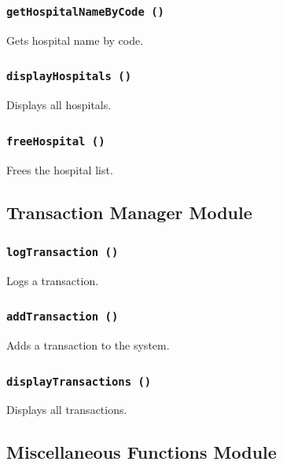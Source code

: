 \documentclass[12pt,a4paper]{report}
\begin{document}
\subsubsection{\texttt{getHospitalNameByCode ()}}
Gets hospital name by code.


\subsubsection{\texttt{displayHospitals ()}}
Displays all hospitals.


\subsubsection{\texttt{freeHospital ()}}
Frees the hospital list.


\subsection{Transaction Manager Module}
\subsubsection{\texttt{logTransaction ()}}
Logs a transaction.


\subsubsection{\texttt{addTransaction ()}}
Adds a transaction to the system.


\subsubsection{\texttt{displayTransactions ()}}
Displays all transactions.


\subsection{Miscellaneous Functions Module}
\end{document}

